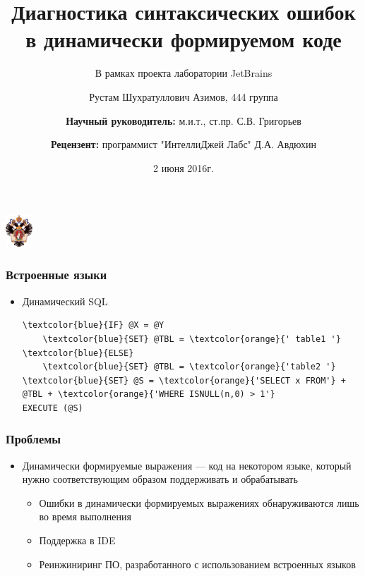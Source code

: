 \documentclass{beamer}
\title[]{Диагностика синтаксических ошибок в динамически формируемом коде}
\subtitle[]{В рамках проекта лаборатории JetBrains}
\institute[СПбГУ]{
Санкт-Петербургский государственный университет \\
Кафедра системного программирования }
\author[Рустам Азимов]{Рустам Шухратуллович Азимов, 444 группа \\
  \and  
    {\bfseries Научный руководитель:} м.и.т., ст.пр. С.В. Григорьев \\ 
  \and
    {\bfseries Рецензент:} программист "ИнтеллиДжей Лабс" Д.А. Авдюхин}
\date{2 июня 2016г.}
\begin{document}
{
\begin{frame}
  \begin{center}
  {\includegraphics[width=1cm]{pictures/SPbGU_Logo.png}}
  \end{center}
  \titlepage
\end{frame}
}

\begin{frame}[fragile]
  \transwipe[direction=90]
  \frametitle{Встроенные языки}
  \begin{itemize}
    \item Динамический SQL
      \begin{Verbatim}[commandchars=\\\{\}]
\textcolor{blue}{IF} @X = @Y
    \textcolor{blue}{SET} @TBL = \textcolor{orange}{' table1 '}
\textcolor{blue}{ELSE}
    \textcolor{blue}{SET} @TBL = \textcolor{orange}{'table2 '}
\textcolor{blue}{SET} @S = \textcolor{orange}{'SELECT x FROM'} + @TBL + \textcolor{orange}{'WHERE ISNULL(n,0) > 1'}
EXECUTE (@S)
       \end{Verbatim}
    \end{itemize}
\end{frame}

\begin{frame}[fragile]
	\transwipe[direction=90]
	\frametitle{Проблемы}
	\begin{itemize}
	    \item Динамически формируемые выражения --- код на некотором языке, который нужно соответствующим образом поддерживать и обрабатывать
        \begin{itemize}
    	    \item Ошибки в динамически формируемых выражениях обнаруживаются лишь во время выполнения
	        \item Поддержка в IDE
	        \item Реинжиниринг ПО, разработанного с использованием встроенных языков
	    \end{itemize}
    \end{itemize}
\end{frame}
\end{document}
